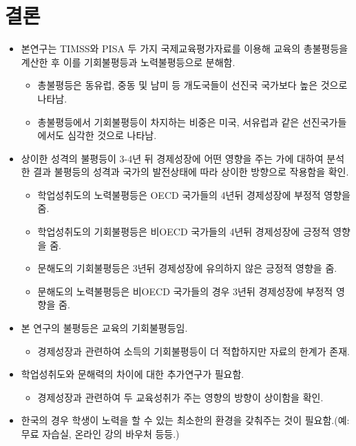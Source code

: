 \documentclass[handout, 10pt]{beamer}
\begin{document}
\section{결론}
\begin{frame}
    \begin{itemize}
        \item 본연구는 TIMSS와 PISA 두 가지 국제교육평가자료를 이용해 교육의 총불평등을 계산한 후 이를 기회불평등과 노력불평등으로 분해함.
        \begin{itemize}
            \item 총불평등은 동유럽, 중동 및 남미 등 개도국들이 선진국 국가보다 높은 것으로 나타남.
            \item 총불평등에서 기회불평등이 차지하는 비중은 미국, 서유럽과 같은 선진국가들에서도 심각한 것으로 나타남.
        \end{itemize}
    \end{itemize}
\end{frame}

\begin{frame}
    \begin{itemize}
        \item 상이한 성격의 불평등이 3-4년 뒤 경제성장에 어떤 영향을 주는 가에 대하여 분석한 결과 불평등의 성격과 국가의 발전상태에 따라 상이한 방향으로 작용함을 확인.
        \begin{itemize}
            \item 학업성취도의 노력불평등은 OECD 국가들의 4년뒤 경제성장에 부정적 영향을 줌.
            \item 학업성취도의 기회불평등은 비OECD 국가들의 4년뒤 경제성장에 긍정적 영향을 줌.
            \item 문해도의 기회불평등은 3년뒤 경제성장에 유의하지 않은 긍정적 영향을 줌.
            \item 문해도의 노력불평등은 비OECD 국가들의 경우 3년뒤 경제성장에 부정적 영향을 줌.
        \end{itemize}
    \end{itemize}
\end{frame}

\begin{frame}
    \begin{itemize}
        \item 본 연구의 불평등은 교육의 기회불평등임. 
        \begin{itemize}
            \item 경제성장과 관련하여 소득의 기회불평등이 더 적합하지만 자료의 한계가 존재.
        \end{itemize}
        \item 학업성취도와 문해력의 차이에 대한 추가연구가 필요함.
        \begin{itemize}
            \item 경제성장과 관련하여 두 교육성취가 주는 영향의 방향이 상이함을 확인.
        \end{itemize}
        \item 한국의 경우 학생이 노력을 할 수 있는 최소한의 환경을 갖춰주는 것이 필요함.(예: 무료 자습실, 온라인 강의 바우처 등등.)
    \end{itemize}
\end{frame}
\end{document}
